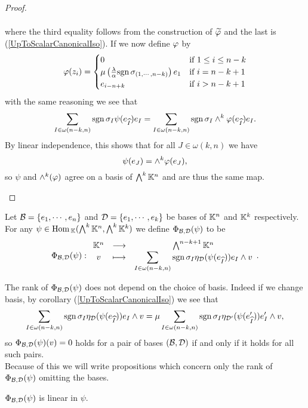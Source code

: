 \begin{proof}
\begin{itemize}
\begin{align*}
\end{align*}
where the third equality follows from the construction of $\widetilde{\varphi}$ and the last is (\ref{UpToScalarCanonicalIso}). If we now define $\varphi$ by
\[\varphi(z_i)=\begin{cases}
0 & \text{if }1\leq i\leq n-k\\
\mu\left({\frac{\lambda}{\alpha}\mathrm{sgn}\,\sigma_{(1,\cdots,n-k)}}\right) e_1 & \text{if }i=n-k+1\\
e_{i-n+k} & \text{if }i>n-k+1
\end{cases}\]
with the same reasoning we see that
\[\sum_{I\in \omega(n-k,n)}\mathrm{sgn}\,\sigma_I\psi(e_{\widehat{I}})e_I=\sum_{I\in \omega(n-k,n)}\mathrm{sgn}\,\sigma_I\wedge^k\varphi(e_{\widehat{I}})e_I.\]
By linear independence, this shows that for all $J\in\omega(k,n)$ we have
\[\psi(e_J)=\wedge^k \varphi(e_J),\]
so $\psi$ and $\wedge^k(\varphi)$ agree on a basis of $\bigwedge^k\mathbb{K}^n$ and are thus the same map. 
\end{itemize}
\setlength{\leftmargini}{0.5cm}
\end{proof}

\begin{definition}
Let $\mathcal{B}=\left\{{e_1,\cdots, e_n}\right\}$ and $\mathcal{D}=\left\{{e_1,\cdots, e_k}\right\}$ be bases of $\mathbb{K}^n$ and $\mathbb{K}^k$ respectively. For any $\psi\in \mathrm{Hom}\,_{\mathbb{K}}(\bigwedge^k\mathbb{K}^n,\bigwedge^k\mathbb{K}^k)$ we define $\Phi_{\mathcal{B},\mathcal{D}}(\psi)$ to be
\[\Phi_{\mathcal{B},\mathcal{D}}(\psi):\begin{array}{ccc} {\mathbb{K}^n} & \longrightarrow & {\bigwedge^{n-k+1}\mathbb{K}^n}\\ {v} & \longmapsto & {\displaystyle\sum_{I\in \omega(n-k,n)}\mathrm{sgn}\,\sigma_I\eta_{\mathcal{D}}(\psi(e_{\widehat{I}}))e_I\wedge v} \end{array}.\]
\end{definition}

\begin{remark}\label{RankPhiIsBaseIndependent}
The rank of $\Phi_{\mathcal{B},\mathcal{D}}(\psi)$ does not depend on the choice of basis. Indeed if we change basis, by corollary (\ref{UpToScalarCanonicalIso}) we see that
\[\sum_{I\in \omega(n-k,n)}\mathrm{sgn}\,\sigma_I\eta_{\mathcal{D}}(\psi(e_{\widehat{I}}))e_I\wedge v=\mu\sum_{I\in \omega(n-k,n)}\mathrm{sgn}\,\sigma_I\eta_{\mathcal{D}'}(\psi(e'_{\widehat{I}}))e'_I\wedge v,\]
so $\Phi_{\mathcal{B},\mathcal{D}}(\psi)(v)=0$ holds for a pair of bases $(\mathcal{B},\mathcal{D})$ if and only if it holds for all such pairs.\\
Because of this we will write propositions which concern only the rank of $\Phi_{\mathcal{B},\mathcal{D}}(\psi)$ omitting the bases.
\end{remark}

\begin{remark}
$\Phi_{\mathcal{B},\mathcal{D}}(\psi)$ is linear in $\psi$.
\end{remark}

